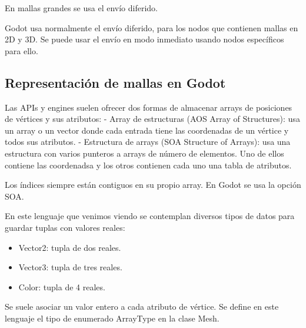 \documentclass[12pt]{book} %
\providecommand{\tightlist}{%
  \setlength{\itemsep}{0pt}\setlength{\parskip}{0pt}}
\begin{document}
En mallas grandes se usa el envío diferido.

Godot usa normalmente el envío diferido, para los nodos que contienen
mallas en 2D y 3D. Se puede usar el envío en modo inmediato usando nodos
específicos para ello.

\hypertarget{representaciuxf3n-de-mallas-en-godot}{%
\subsection{Representación de mallas en
Godot}\label{representaciuxf3n-de-mallas-en-godot}}

Las APIs y engines suelen ofrecer dos formas de almacenar arrays de
posiciones de vértices y sus atributos: - Array de estructuras (AOS
Array of Structures): usa un array o un vector donde cada entrada tiene
las coordenadas de un vértice y todos sus atributos. - Estructura de
arrays (SOA Structure of Arrays): usa una estructura con varios punteros
a arrays de número de elementos. Uno de ellos contiene las coordenadsa y
los otros contienen cada uno una tabla de atributos.

Los índices siempre están contiguos en su propio array. En Godot se usa
la opción SOA.

En este lenguaje que venimos viendo se contemplan diversos tipos de
datos para guardar tuplas con valores reales:

\begin{itemize}
\tightlist
\item
  Vector2: tupla de dos reales.
\item
  Vector3: tupla de tres reales.
\item
  Color: tupla de 4 reales.
\end{itemize}

Se suele asociar un valor entero a cada atributo de vértice. Se define
en este lenguaje el tipo de enumerado ArrayType en la clase Mesh.
\end{document}
